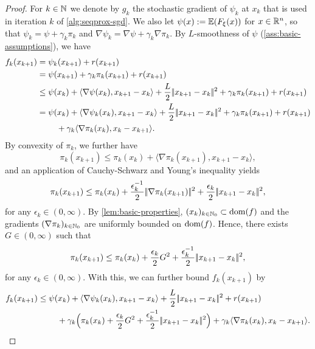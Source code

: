\begin{proof}
    For $k\in\mathbb{N}$ we denote by $g_k$ the stochastic gradient of $\psi_k$ at $x_k$
    that is used in iteration $k$ of \cref{alg:seqprox-sgd}.
    We also let $\psi(x) := \mathbb{E}(F_\xi(x))$ for $x\in\mathbb{R}^n$, so that
    $\psi_k = \psi + \gamma_k\pi_k$ and
    $\nabla \psi_k = \nabla \psi + \gamma_k \nabla\pi_k$.
    By $L$-smoothness of $\psi$ (\cref{ass:basic-assumptions}),
    we have
    \begin{align*}
        f_k(x_{k+1})
        &= \psi_k(x_{k+1}) + r(x_{k+1}) \\
        &= \psi(x_{k+1}) + \gamma_k\pi_k(x_{k+1}) + r(x_{k+1}) \\
        &\leq \psi(x_k) + \langle \nabla \psi(x_k), x_{k+1} - x_k \rangle + \frac{L}{2} |\!|x_{k+1} - x_k|\!|^2 + \gamma_k\pi_k(x_{k+1}) + r(x_{k+1}) \\
        &= \psi(x_k) + \langle \nabla \psi_k(x_k), x_{k+1} - x_k \rangle + \frac{L}{2} |\!|x_{k+1} - x_k|\!|^2
            + \gamma_k\pi_k(x_{k+1}) + r(x_{k+1}) \\
        &\phantom{===}+ \gamma_k \langle \nabla \pi_k(x_k), x_k - x_{k+1} \rangle.
    \end{align*}
    By convexity of $\pi_k$, we further have
    \[
        \pi_k(x_{k+1}) \leq \pi_k(x_k) + \langle \nabla \pi_k(x_{k+1}), x_{k+1} - x_k \rangle,
    \]
    and an application of Cauchy-Schwarz and Young's inequality yields
    \[
        \pi_k(x_{k+1})
        \leq \pi_k(x_k) + \frac{\epsilon_k^{-1}}{2} |\!|\nabla \pi_k(x_{k+1})|\!|^2 + \frac{\epsilon_k}{2} |\!|x_{k+1} - x_k|\!|^2,
    \]
    for any $\epsilon_k \in (0,\infty)$.
    By \cref{lem:basic-properties}, $(x_k)_{k\in\mathbb{N}_0}\subset \operatorname{dom}(f)$ and
    the gradients $(\nabla \pi_k)_{k\in\mathbb{N}_0}$ are uniformly bounded on $\operatorname{dom}(f)$.
    Hence, there exists $G\in(0,\infty)$ such that
    \[
        \pi_k(x_{k+1})
        \leq \pi_k(x_k) + \frac{\epsilon_k}{2} G^2 + \frac{\epsilon_k^{-1}}{2} |\!|x_{k+1} - x_k|\!|^2,
    \]
    for any $\epsilon_k\in(0,\infty)$.
    With this, we can further bound $f_k(x_{k+1})$ by
    \begin{align*}
        f_k(x_{k+1})
        &\leq \psi(x_k) + \langle \nabla \psi_k(x_k), x_{k+1} - x_k \rangle + \frac{L}{2} \norm{x_{k+1} - x_k}^2 + r(x_{k+1}) \\
        &\phantom{===}+ \gamma_k\Big( \pi_k(x_k) + \frac{\epsilon_k}{2} G^2 + \frac{\epsilon_k^{-1}}{2} \norm{x_{k+1} - x_k}^2 \Big)
            + \gamma_k \langle \nabla \pi_k(x_k), x_k - x_{k+1} \rangle. \\

\end{align*}
\end{proof}
